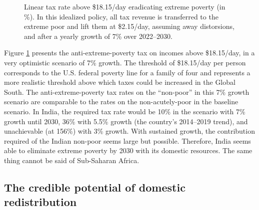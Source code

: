 \documentclass[12pt,english]{article}
\begin{document}
\begin{figure}[b!]
  \caption[Anti-extreme-poverty tax above \$18.15/day in 2030 after 3\% growth.]{Linear tax rate above \$18.15/day eradicating extreme poverty (in \%). In this idealized policy, all tax revenue is transferred to the extreme poor and lift them at \$2.15/day, assuming away distorsions, and after a yearly growth of 7\% over 2022--2030.
  }\label{fig:antipoverty_tax_18}
\end{figure}

Figure \ref{fig:antipoverty_tax_18} presents the anti-extreme-poverty tax on incomes above \$18.15/day, in a very optimistic scenario of 7\% growth. The threshold of \$18.15/day per person corresponds to the U.S. federal poverty line for a family of four and represents a more realistic threshold above which taxes could be increased in the Global South. The anti-extreme-poverty tax rates on the ``non-poor'' %
in this 7\% growth scenario are comparable to the rates on the non-acutely-poor in the baseline scenario. In India, the required tax rate would be 10\% %
in the scenario with 7\% growth until 2030, 36\% with 5.5\% growth (the country's 2014--2019 trend), and unachievable (at 156\%) with 3\% growth. %
With sustained growth, the contribution required of the Indian non-poor seems large but possible. %
Therefore, India seems able to eliminate extreme poverty by 2030 with its domestic resources. The same thing cannot be said of Sub-Saharan Africa. %


\subsection{The credible potential of domestic redistribution}
\end{document}

